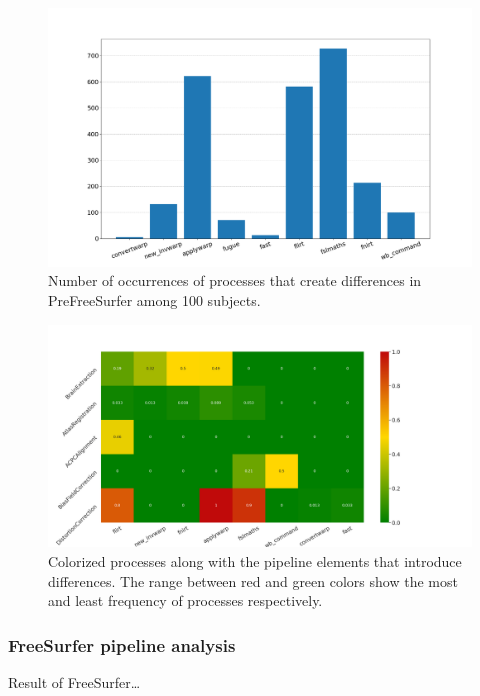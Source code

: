 \documentclass[a4paper,num-refs]{oup-contemporary}
\begin{document}
\begin{figure}
  \centering
    \includegraphics[width=\columnwidth]{images/pfs_barchart.png} \caption{Number 
    of occurrences of processes that create differences in PreFreeSurfer 
    among 100 subjects.} 
    \label{fig:pfs_chart}
  \end{figure}

\begin{figure}
\centering
  \includegraphics[width=\columnwidth]{images/pfs_frequency.png}
  \caption{Colorized processes along with the pipeline elements that introduce 
           differences. The range between red and green colors show the most and 
           least frequency of processes respectively.}
  \label{fig:pfs_freq}
\end{figure}


\subsubsection{FreeSurfer pipeline analysis} 
Result of FreeSurfer\dots
\end{document}
